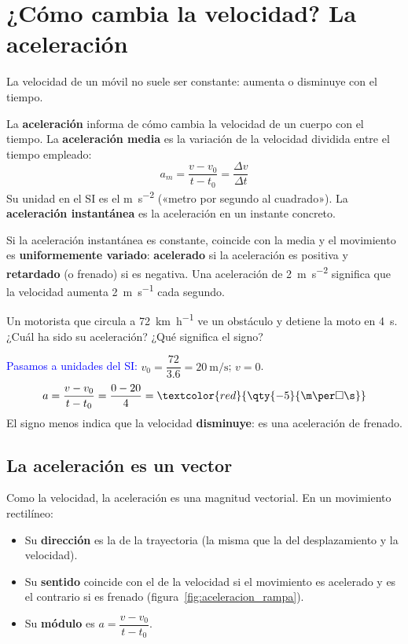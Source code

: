 \section{¿Cómo cambia la velocidad? La aceleración}

La velocidad de un móvil no suele ser constante: aumenta o disminuye con el tiempo.

\begin{definition}[Aceleración]
    La \textbf{aceleración} informa de cómo cambia la velocidad de un cuerpo con el tiempo. La \textbf{aceleración media} es la variación de la velocidad dividida entre el tiempo empleado:
    \[ a_m = \frac{v - v_0}{t - t_0} = \frac{\Delta v}{\Delta t} \]
    Su unidad en el SI es el \unit{\m\per\square\s} («metro por segundo al cuadrado»). La \textbf{aceleración instantánea} es la aceleración en un instante concreto.
\end{definition}

Si la aceleración instantánea es constante, coincide con la media y el movimiento es \textbf{uniformemente variado}: \textbf{acelerado} si la aceleración es positiva y \textbf{retardado} (o frenado) si es negativa. Una aceleración de \qty{2}{\m\per\square\s} significa que la velocidad aumenta \qty{2}{\m\per\s} cada segundo.

\begin{example}
    Un motorista que circula a \qty{72}{\km\per\hour} ve un obstáculo y detiene la moto en \qty{4}{\s}. ¿Cuál ha sido su aceleración? ¿Qué significa el signo?

    \textcolor{blue}{Pasamos a unidades del SI:} \(v_0 = \dfrac{72}{\num{3.6}} = \qty{20}{\m\per\s}\); \(v = 0\).
    \[ a = \frac{v - v_0}{t - t_0} = \frac{0 - 20}{4} = \textcolor{red}{\qty{-5}{\m\per\square\s}} \]
    El signo menos indica que la velocidad \textbf{disminuye}: es una aceleración de frenado.
\end{example}

\subsection{La aceleración es un vector}

Como la velocidad, la aceleración es una magnitud vectorial. En un movimiento rectilíneo:
\begin{itemize}
    \item Su \textbf{dirección} es la de la trayectoria (la misma que la del desplazamiento y la velocidad).
    \item Su \textbf{sentido} coincide con el de la velocidad si el movimiento es acelerado y es el contrario si es frenado (figura~\ref{fig:aceleracion_rampa}).
    \item Su \textbf{módulo} es \(a = \dfrac{v - v_0}{t - t_0}\).
\end{itemize}

